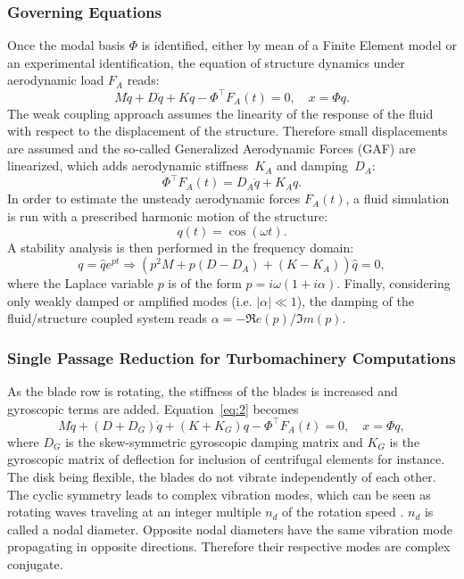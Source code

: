 \subsubsection{Governing Equations}
Once the modal basis $\Phi$ is identified, either by mean of a Finite
Element model or an experimental identification, the equation of
structure dynamics under aerodynamic load $F_A$ reads:
\begin{equation}
  \label{eq:2}
  M\ddot{q}+D\dot{q}+Kq-\Phi^\top F_A(t)=0, \quad x=\Phi q.
\end{equation}
The weak coupling approach assumes the linearity of the response of
the fluid with respect to the displacement of the structure. Therefore
small displacements are assumed and the so-called Generalized
Aerodynamic Forces (GAF) are linearized, which adds aerodynamic
stiffness~$K_A$ and damping~$D_A$:
\begin{equation}
  \label{eq:4}
  \Phi^\top F_A(t) = D_A\dot{q}+K_Aq.
\end{equation}
In order to estimate the unsteady aerodynamic forces $F_A(t)$,
  a fluid simulation is run with a prescribed harmonic motion of the
  structure:
\begin{equation}
  \label{eq:6}
  q(t)=\cos(\omega t).
\end{equation}
A stability analysis is then performed in the frequency domain:
\begin{equation}
  \label{eq:5}
  q=\hat{q}e^{p t}\Rightarrow\left(
    p^2M + p(D-D_A) + (K-K_A)
  \right)\hat{q}=0,
\end{equation}
where the Laplace variable $p$ is of the form
$p=i\omega(1+i\alpha)$. Finally, considering only weakly damped or
amplified modes (i.e. $|\alpha| \ll 1$), the damping of the
fluid/structure coupled system reads $\alpha=-\Re e(p)/\Im m(p)$.

\subsubsection{Single Passage Reduction for Turbomachinery Computations}

As the blade row is rotating, the stiffness of the blades is increased
and gyroscopic terms are added. Equation~\eqref{eq:2} becomes
\begin{equation}
  \label{eq:gyr}
  M\ddot{q}+(D+D_G)\dot{q}+(K+K_G)q-\Phi^\top F_A(t)=0, \quad x=\Phi q,
\end{equation}
where $D_G$ is the skew-symmetric gyroscopic damping matrix and $K_G$ is
the gyroscopic matrix of deflection for inclusion of centrifugal
elements for instance.  The disk being flexible, the blades do not vibrate
independently of each other. The cyclic symmetry leads to complex
vibration modes, which can be seen as rotating waves traveling at an
integer multiple $n_d$ of the rotation speed \cite{Lane:1956fk}. $n_d$
is called a nodal diameter. Opposite nodal diameters have the same
vibration mode propagating in opposite directions. Therefore their
respective modes are complex conjugate.



